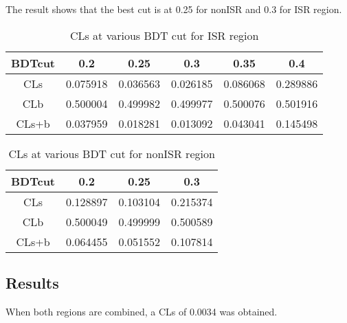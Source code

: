 The result shows that the best cut is at 0.25 for nonISR and 0.3 for ISR region.

\begin{table}
\begin{center}
\begin{tabular}{|c|c|c|c|c|c|}
\hline 
BDTcut	&0.2	&0.25	&0.3	&0.35	&0.4 \\
\hline 
CLs	&0.075918	&0.036563	&0.026185	&0.086068	&0.289886\\
CLb	&0.500004	&0.499982	&0.499977	&0.500076	&0.501916\\
CLs+b	&0.037959	&0.018281	&0.013092	&0.043041	&0.145498\\
\hline 
\end{tabular} 
\caption{CLs at various BDT cut for ISR region}
\end{center}
\end{table}

\begin{table}
\begin{center}
\begin{tabular}{|c|c|c|c|}
\hline 
BDTcut	&0.2	&0.25	&0.3\\
\hline 
CLs	&0.128897	&0.103104&	0.215374\\
CLb&	0.500049	&0.499999&	0.500589\\
CLs+b	&0.064455&	0.051552&	0.107814\\
\hline 
\end{tabular} 
\caption{CLs at various BDT cut for nonISR region}
\end{center}
\end{table}
\subsection{Results}
When both regions are combined, a CLs of 0.0034 was obtained.

